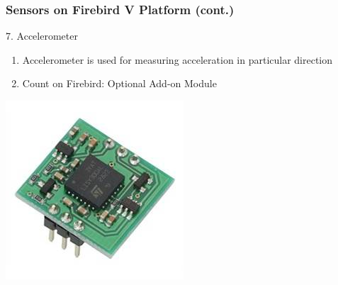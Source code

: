\documentclass[10pt,red]{beamer}
\begin{document}
\begin{frame}
	\frametitle{Sensors on Firebird V Platform (cont.)} 
	7. Accelerometer	\pause
		\vfill
		\begin{minipage}[c]{0.5\textwidth}
			\begin{enumerate}
				\item <+-|alert@+> Accelerometer is used for measuring acceleration in particular direction \\[10pt]
				\item <+-|alert@+> Count on Firebird: Optional Add-on Module
			\end{enumerate}
		\end{minipage}
		\hfill
		\begin{minipage}[c]{0.4\textwidth}
			\includegraphics[width=\linewidth]{accelerometer}
		\end{minipage}	
\end{frame}	
\end{document}
